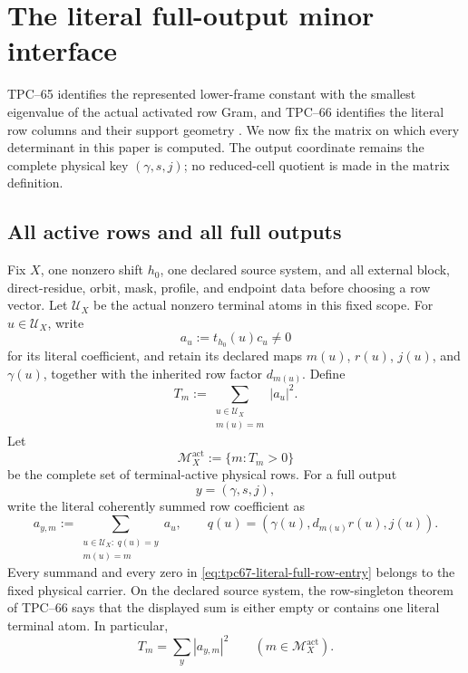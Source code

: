 \section{The literal full-output minor interface}
\label{sec:tpc67-physical-minor-interface}

TPC--65 identifies the represented lower-frame constant with the smallest
eigenvalue of the actual activated row Gram, and TPC--66 identifies the
literal row columns and their support geometry
\citep{WangTPC65,WangTPC66}.  We now fix the matrix on which every
determinant in this paper is computed.  The output coordinate remains the
complete physical key \((\gamma,s,j)\); no reduced-cell quotient is made
in the matrix definition.

\subsection{All active rows and all full outputs}

Fix \(X\), one nonzero shift \(h_0\), one declared source system, and all
external block, direct-residue, orbit, mask, profile, and endpoint data
before choosing a row vector.  Let \(\mathcal U_X\) be the actual nonzero
terminal atoms in this fixed scope.  For \(u\in\mathcal U_X\), write
\[
 a_u:=t_{h_0}(u)c_u\ne0
\]
for its literal coefficient, and retain its declared maps \(m(u)\), \(r(u)\),
\(j(u)\), and \(\gamma(u)\), together with the inherited row factor \(d_{m(u)}\).
Define
\[
 T_m:=\sum_{\substack{u\in\mathcal U_X\\m(u)=m}}|a_u|^2.
\]
Let
\[
 \mathcal M_X^{\mathrm{act}}
 :=\{m:T_m>0\}
\]
be the complete set of terminal-active physical rows.  For a full output
\[
 y=(\gamma,s,j),
\]
write the literal coherently summed row coefficient as
\begin{equation}
 a_{y,m}
 :=
 \sum_{\substack{u\in\mathcal U_X:\ q(u)=y\\m(u)=m}}
 a_u,
 \qquad
 q(u)=(\gamma(u),d_{m(u)}r(u),j(u)).
 \label{eq:tpc67-literal-full-row-entry}
\end{equation}
Every summand and every zero in
\eqref{eq:tpc67-literal-full-row-entry} belongs to the fixed physical
carrier.  On the declared source system, the row-singleton theorem of
TPC--66 says that the displayed sum is either empty or contains one
literal terminal atom.  In particular,
\begin{equation}
 T_m=\sum_y|a_{y,m}|^2
 \qquad(m\in\mathcal M_X^{\mathrm{act}}).
 \label{eq:tpc67-row-terminal-mass}
\end{equation}


